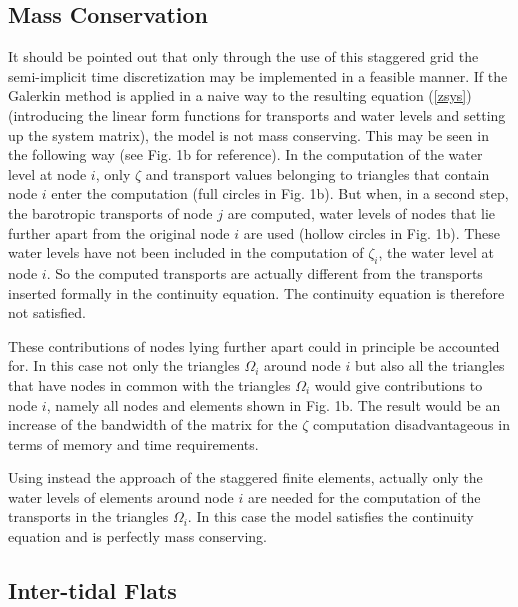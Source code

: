 
\subsection{Mass Conservation}
\label{mass}
It should be pointed out that only through the use of this staggered grid
the semi-implicit time discretization may be implemented in a feasible
manner. If the Galerkin method is applied
 in a naive way to the resulting equation
(\ref{zsys}) (introducing the linear form functions for transports
and water levels and setting up the system matrix),
the model is not mass conserving.
This may be seen in the following way (see Fig. 1b for reference).
In the computation of the water level at
node $i$, only $\zeta$ and transport values
belonging to triangles that contain node $i$ enter the computation
(full circles in Fig. 1b).
But when, in a second step, the barotropic transports
of node $j$ are computed, water levels of nodes that lie further apart
from the original node $i$ are used
(hollow circles in Fig. 1b).
These water levels have not been included in
the computation of $\zeta_i$, the water level at node $i$.
So the computed transports are actually different
from the transports inserted formally in the continuity equation.
The continuity equation is therefore not satisfied.

These contributions of nodes lying further apart could in principle
be accounted for. In this case
not only the triangles
$\Omega_{i}$ around node $i$ but also all the triangles that have
nodes in common with the triangles $\Omega_{i}$ would give
contributions to node $i$, namely all nodes and elements shown
in Fig. 1b.
The result would be
an increase of the bandwidth of the matrix for the $\zeta$ computation
disadvantageous in terms of memory and time requirements.

Using instead the approach of the staggered finite elements, actually
only the water levels of elements around node $i$ are needed for
the computation of the transports in the triangles $\Omega_i$.
In this case the model satisfies the
continuity equation and is perfectly mass conserving.


\subsection{Inter-tidal Flats}


